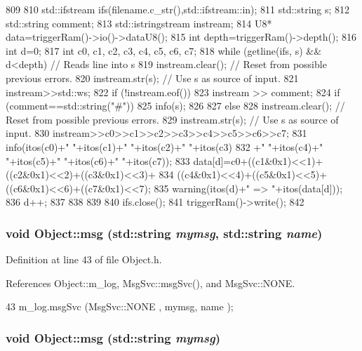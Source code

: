 \begin{DoxyCode}
809                                         {
810   std::ifstream ifs(filename.c_str(),std::ifstream::in);
811   std::string s;
812   std::string comment;
813   std::istringstream instream;
814   U8* data=triggerRam()->io()->dataU8();
815   int depth=triggerRam()->depth();
816   int d=0;
817   int c0, c1, c2, c3, c4, c5, c6, c7;
818   while (getline(ifs, s) && d<depth) { // Reads line into s
819       instream.clear();     // Reset from possible previous errors.
820       instream.str(s);      // Use s as source of input.
821       instream>>std::ws;
822       if (!instream.eof()) {
823         instream >> comment;
824         if (comment==std::string("#")) {
825           info(s);
826         }
827         else {
828           instream.clear();     // Reset from possible previous errors.
829           instream.str(s);      // Use s as source of input.
830           instream>>c0>>c1>>c2>>c3>>c4>>c5>>c6>>c7;
831           info(itos(c0)+" "+itos(c1)+" "+itos(c2)+" "+itos(c3)
832               +" "+itos(c4)+" "+itos(c5)+" "+itos(c6)+" "+itos(c7));
833           data[d]=c0+((c1&0x1)<<1)+((c2&0x1)<<2)+((c3&0x1)<<3)+
834               ((c4&0x1)<<4)+((c5&0x1)<<5)+((c6&0x1)<<6)+((c7&0x1)<<7);
835           warning(itos(d)+" => "+itos(data[d]));
836           d++;
837         }
838       }
839   }
840   ifs.close();
841   triggerRam()->write();
842 }
\end{DoxyCode}
\hypertarget{classObject_ac5d59299273cee27aacf7de00d2e7034}{
\subsubsection[{msg}]{\setlength{\rightskip}{0pt plus 5cm}void Object::msg (std::string {\em mymsg}, \/  std::string {\em name})}}
\label{classObject_ac5d59299273cee27aacf7de00d2e7034}


Definition at line 43 of file Object.h.

References Object::m\_\-log, MsgSvc::msgSvc(), and MsgSvc::NONE.


\begin{DoxyCode}
43 { m_log.msgSvc (MsgSvc::NONE    , mymsg, name ); }
\end{DoxyCode}
\hypertarget{classObject_a58b2d0618c2d08cf2383012611528d97}{
\subsubsection[{msg}]{\setlength{\rightskip}{0pt plus 5cm}void Object::msg (std::string {\em mymsg})}}
\label{classObject_a58b2d0618c2d08cf2383012611528d97}


